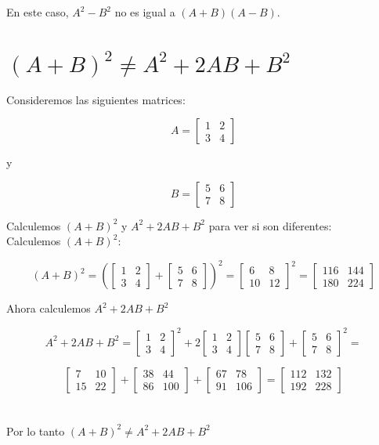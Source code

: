 \documentclass[a4paper,12pt]{article}
\begin{document}
En este caso, \(A^2 - B^2\) no es igual a \((A+B)(A-B)\).


\section{\((A + B)^2 \neq A^2+2AB +B^2  \)}
Consideremos las siguientes matrices:

\[ A = \begin{bmatrix} 1 & 2 \\ 3 & 4 \end{bmatrix} \]

y 

\[ B = \begin{bmatrix} 5 & 6 \\ 7 & 8 \end{bmatrix} \]

Calculemos \((A + B)^2 \) y \(A^2+2AB+B^2\) para ver si son diferentes: \\

Calculemos \((A+B)^2\):

\[ (A+B)^2 = 
(\begin{bmatrix} 1 & 2 \\ 3 & 4 \end{bmatrix} + 
\begin{bmatrix} 5 & 6 \\ 7 & 8 \end{bmatrix} )^2 = 
\begin{bmatrix} 6 & 8 \\ 10 & 12 \end {bmatrix}^2 =
\begin{bmatrix} 116 & 144 \\ 180 & 224 \end{bmatrix} \] 

Ahora calculemos \(A^2+2AB+B^2\)

\[A^2 +2AB+B^2= 
\begin{bmatrix} 1 & 2 \\ 3 & 4 \end{bmatrix}^2 +
2\begin{bmatrix} 1 & 2 \\ 3 & 4 \end{bmatrix} \begin{bmatrix} 5 & 6 \\ 7 & 8 \end{bmatrix} +
\begin{bmatrix} 5 & 6 \\ 7 & 8 \end{bmatrix}^2 =
\]

\[
\begin{bmatrix} 7 & 10 \\ 15 & 22 \end{bmatrix} +
\begin{bmatrix} 38 & 44 \\ 86 & 100 \end{bmatrix} +
\begin{bmatrix} 67 & 78 \\ 91 & 106 \end{bmatrix} =
\begin{bmatrix} 112 & 132 \\ 192 & 228 \end{bmatrix} 
\]
\\\\
Por lo tanto \((A+B)^2 \neq A^2 +2AB+B^2\)
\end{document}

